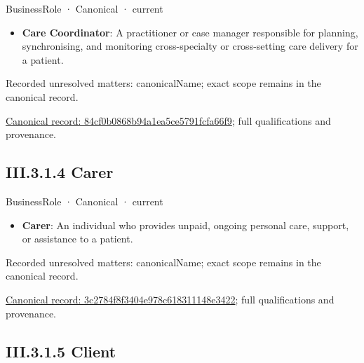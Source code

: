 \label{element:84cf0b0868b94a1ea5ce5791fcfa66f9}
{\small BusinessRole · Canonical · current}\par

\begin{itemize}


\item \textbf{Care Coordinator}: A practitioner or case manager responsible for planning, synchronising, and monitoring cross-specialty or cross-setting care delivery for a patient.

\end{itemize}

{\small Recorded unresolved matters: canonicalName; exact scope remains in the canonical record.}\par
{\footnotesize \href{../../../../continuum/business/business-role/84cf0b0868b94a1ea5ce5791fcfa66f9.md}{Canonical record: 84cf0b0868b94a1ea5ce5791fcfa66f9}; full qualifications and provenance.}\par
\subsection*{III.3.1.4 Carer}
\label{navigation:III.3.1.4}

\label{element:3c2784f8f3404e978c618311148e3422}
{\small BusinessRole · Canonical · current}\par

\begin{itemize}


\item \textbf{Carer}: An individual who provides unpaid, ongoing personal care, support, or assistance to a patient.

\end{itemize}

{\small Recorded unresolved matters: canonicalName; exact scope remains in the canonical record.}\par
{\footnotesize \href{../../../../continuum/business/business-role/3c2784f8f3404e978c618311148e3422.md}{Canonical record: 3c2784f8f3404e978c618311148e3422}; full qualifications and provenance.}\par
\subsection*{III.3.1.5 Client}
\label{navigation:III.3.1.5}

